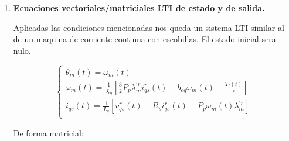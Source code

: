 \documentclass{article}
\begin{document}
\begin{enumerate}[label=\roman*.]
    \item \textbf{Ecuaciones vectoriales/matriciales LTI de estado y de salida.} 
    
    Aplicadas las condiciones mencionadas nos queda un sistema LTI similar al de un maquina 
    de corriente continua con escobillas. El estado inicial sera nulo.

    \begin{equation}
        \begin{cases}
            \dot{\theta}_{m}(t) = \omega_{m}(t)\\
            \dot{\omega}_{m}(t) = \frac{1}{J_{eq}}[\frac{3}{2}P_{p}\lambda_{m}^{\prime r}i_{qs}^r(t) - b_{eq}\omega_{m}(t) - \frac{T_{l}(t)}{r}]\\
            \dot{i}_{qs}(t) = \frac{1}{L_{q}}[v_{qs}^r(t) - R_{s}i_{qs}^r(t) - P_{p}\omega_{m}(t)\lambda_{m}^{\prime r}]  \\
        \end{cases}
    \end{equation}

    De forma matricial:


\end{enumerate}
\end{document}
